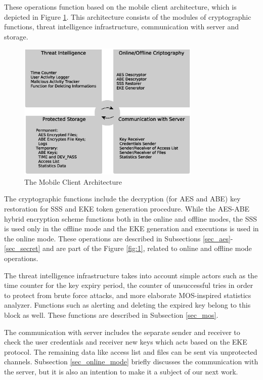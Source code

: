 \documentclass[twocolumn]{svjour3}          %
\begin{document}
These operations function based on the mobile client architecture, which is depicted in Figure \ref{fig:2}. This architecture consists of the modules of cryptographic functions, threat intelligence infrastructure, communication with server and storage.

\begin{figure}[h!]
	\centering
	\includegraphics[width=8.7cm]{figures/mobileclientarchitecture.eps}
	\caption{The Mobile Client Architecture}
	\label{fig:2}
\end{figure}

The cryptographic functions include the decryption (for AES and ABE) key restoration for SSS and EKE token generation procedure. While the AES-ABE hybrid encryption scheme functions both in the online and offline modes, the SSS is used only in the offline mode and the EKE generation and executions is used in the online mode. These operations are described in Subsections \ref{sec_aes}-\ref{sec_secret} and are part of the Figure \ref{fig:1}, related to online and offline mode operations.

The threat intelligence infrastructure takes into account simple actors such as the time counter for the key expiry period, the counter of unsuccessful tries in order to protect from brute force attacks, and more elaborate MOS-inspired statistics analyzer. Functions such as alerting and deleting the expired key belong to this block as well. These functions are described in Subsection \ref{sec_mos}.

The communication with server includes the separate sender and receiver to check the user credentials and receiver new keys which acts based on the EKE protocol. The remaining data like access list and files can be sent via unprotected channels. Subsection \ref{sec_online_mode} briefly discusses the communication with the server, but it is also an intention to make it a subject of our next work.
\end{document}
